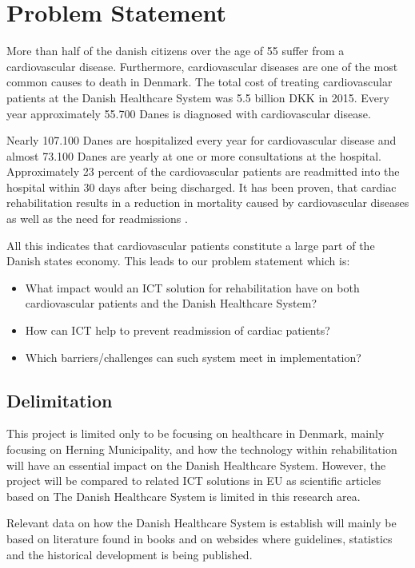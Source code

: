 \newpage
\section{Problem Statement}
More than half of the danish citizens over the age of 55 suffer from a cardiovascular disease. Furthermore, cardiovascular diseases are one of the most common causes to death in Denmark. The total cost of treating cardiovascular patients at the Danish Healthcare System was 5.5 billion DKK in 2015. Every year approximately 55.700 Danes is diagnosed with cardiovascular disease.   

Nearly 107.100 Danes are hospitalized every year for cardiovascular disease and almost 73.100 Danes are yearly at one or more consultations at the hospital. Approximately 23 percent of the cardiovascular patients are readmitted into the hospital within 30 days after being discharged. It has been proven, that cardiac rehabilitation results in a reduction in mortality caused by cardiovascular diseases as well as the need for readmissions \cite{Hjerteforening}.

All this indicates that cardiovascular patients constitute a large part of the Danish states economy. This leads to our problem statement which is:

\begin{itemize}
	\item What impact would an ICT solution for rehabilitation have on both cardiovascular patients and the Danish Healthcare System?
	\item How can ICT help to prevent readmission of cardiac patients?
	\item Which barriers/challenges can such system meet in implementation?
\end{itemize}

\subsection{Delimitation}
This project is limited only to be focusing on healthcare in Denmark, mainly focusing on Herning Municipality, and how the technology within rehabilitation will have an essential impact on the Danish Healthcare System. However, the project will be compared to related ICT solutions in EU as scientific articles based on The Danish Healthcare System is limited in this research area. 

Relevant data on how the Danish Healthcare System is establish will mainly be based on literature found in books and on websides where guidelines, statistics and the historical development is being published. 



